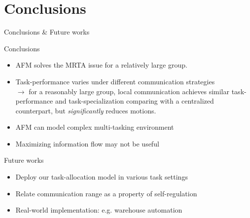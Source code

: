 \documentclass{beamer}
\begin{document}
\section{Conclusions}
\begin{frame}[t]{Conclusions \& Future works}
\begin{block}{Conclusions}
\begin{itemize}
    \item \small \alert{AFM solves the MRTA issue} for a relatively large group.\\
    \item \small \alert{Task-performance varies under different communication strategies}\\
    $\rightarrow$ \small for a reasonably large group, local  communication achieves similar task-performance and task-specialization comparing with a centralized counterpart, but \textit{significantly} reduces motions.    
    \item \small AFM can model complex \alert{multi-tasking environment}\\
    \item \small \alert{Maximizing information flow} may not be  useful\\
 \end{itemize}
 \end{block}
\begin{block}{Future works} 
 \begin{itemize}
    \item \small Deploy our task-allocation model \alert{in various task settings}\\
    \item \small Relate \alert{communication range} as a property of self-regulation\\
    \item \small \alert{Real-world implementation:} e.g. warehouse automation\\
    \end{itemize}
\end{block}
\end{frame}
\end{document}
